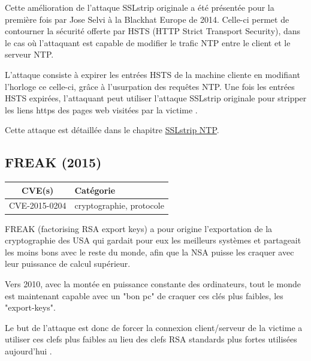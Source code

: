 \vspace{1em}

Cette amélioration de l'attaque SSLstrip originale a été présentée pour la première fois par Jose Selvi à la Blackhat Europe de 2014. Celle-ci permet de contourner la sécurité offerte par HSTS (HTTP Strict Transport Security), dans le cas où l'attaquant est capable de modifier le trafic NTP entre le client et le serveur NTP.

L'attaque consiste à expirer les entrées HSTS de la machine cliente en modifiant l'horloge ce celle-ci, grâce à l'usurpation des requêtes NTP. Une fois les entrées HSTS expirées, l'attaquant peut utiliser l'attaque SSLstrip originale pour stripper les liens https des pages web visitées par la victime \cite{sslstrip-ntp}.

Cette attaque est détaillée dans le chapitre \hyperref[sec:sslstrip-ntp]{SSLstrip NTP}.


\subsection{FREAK (2015)}

\begin{tabularx}{0.96\textwidth}{|c|X|}
  \hline
  \textbf{CVE(s)} & \textbf{Catégorie} \\
  \hline
  CVE-2015-0204 & cryptographie, protocole \\
  \hline
\end{tabularx}

\vspace{1em}

FREAK (factorising RSA export keys) a pour origine l'exportation de la cryptographie des USA qui gardait pour eux les meilleurs systèmes et partageait les moins bons avec le reste du monde, afin que la NSA puisse les craquer avec leur puissance de calcul supérieur.

Vers 2010, avec la montée en puissance constante des ordinateurs, tout le monde est maintenant capable avec un "bon pc" de craquer ces clés plus faibles, les "export-keys".

Le but de l'attaque est donc de forcer la connexion client/serveur de la victime a utiliser ces clefs plus faibles au lieu des clefs RSA standards plus fortes utilisées aujourd'hui \cite{freak}.


